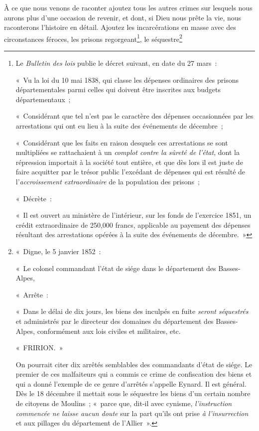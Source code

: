\documentclass[french,twoside]{book} %
\begin{document}
À ce que nous venons de raconter ajoutez tous les autres crimes sur lesquels nous aurons plus d’une occasion de revenir, et dont, si Dieu nous prête la vie, nous raconterons l’histoire en détail. Ajoutez les incarcérations en masse avec des circonstances féroces, les prisons regorgeant\footnote{ \noindent Le \emph{Bulletin des lois} publie le décret suivant, en date du 27 mars :\par
 « Vu la loi du 10 mai 1838, qui classe les dépenses ordinaires des prisons départementales parmi celles qui doivent être inscrites aux budgets départementaux ;\par
 « Considérant que tel n’est pas le caractère des dépenses occasionnées par les arrestations qui ont eu lieu à la suite des événements de décembre ;\par
 « Considérant que les faits en raison desquels ces arrestations se sont multipliées se rattachaient à un \emph{complot contre la sûreté de l’état}, dont la répression importait à la société tout entière, et que dès lors il est juste de faire acquitter par le trésor public l’excédant de dépenses qui est résulté de l’\emph{accroissement extraordinaire} de la population des prisons ;\par
 « Décrète :\par
 « Il est ouvert au ministère de l’intérieur, sur les fonds de l’exercice 1851, un crédit extraordinaire de 250,000 francs, applicable au payement des dépenses résultant des arrestations opérées à la suite des événements de décembre. »
}, le séquestre\footnote{ \noindent « Digne, le 5 janvier 1852 :\par
 « Le colonel commandant l’état de siége dans le département des Basses-Alpes,\par
 « Arrête :\par
 « Dans le délai de dix jours, les biens des inculpés en fuite \emph{seront séquestrés} et administrés par le directeur des domaines du département des Basses-Alpes, conformément aux lois civiles et militaires, etc.\par
 « FRIRION. »\par
 On pourrait citer dix arrêtés semblables des commandants d’état de siége. Le premier de ces malfaiteurs qui a commis ce crime de confiscation des biens et qui a donné l’exemple de ce genre d’arrêtés s’appelle Eynard. Il est général. Dès le 18 décembre il mettait sous le séquestre les biens d’un certain nombre de citoyens de Moulins ; « parce que, dit-il avec cynisme, \emph{l’instruction commencée ne laisse aucun doute} sur la part qu’ils ont prise \emph{à l’insurrection} et aux pillages du département de l’Allier ».
}
\end{document}
